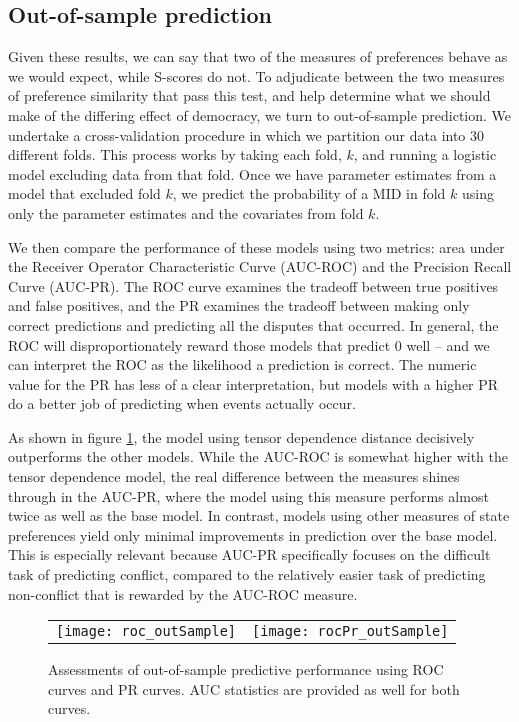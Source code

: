 \subsection*{Out-of-sample prediction}

Given these results, we can say that two of the measures of preferences behave as we would expect, while S-scores do not. To adjudicate between the two measures of preference similarity that pass this test, and help determine what we should make of the differing effect of democracy, we turn to out-of-sample prediction. We undertake a cross-validation procedure in which we partition our data into 30 different folds. This process works by taking each fold, $k$, and running a logistic model excluding data from that fold. Once we have parameter estimates from a model that excluded fold $k$, we predict the probability of a MID in fold $k$ using only the parameter estimates and the covariates from fold $k$.

We then compare the performance of these models using two metrics: area under the Receiver Operator Characteristic Curve (AUC-ROC) and the Precision Recall Curve (AUC-PR). The ROC curve examines the tradeoff between true positives and false positives, and the PR examines the tradeoff between making only correct predictions and predicting all the disputes that occurred. In general, the ROC will disproportionately reward those models that predict $0$ well -- and we can interpret the ROC as the likelihood a prediction is correct. The numeric value for the PR has less of a clear interpretation, but models with a higher PR do a better job of predicting when events actually occur.

As shown in figure \ref{fig:roc}, the model using tensor dependence distance decisively outperforms the other models. While the AUC-ROC is somewhat higher with the tensor dependence model, the real difference between the measures shines through in the AUC-PR, where the model using this measure performs almost twice as well as the base model. In contrast, models using other measures of state preferences yield only minimal improvements in prediction over the base model. This is especially relevant because AUC-PR specifically focuses on the difficult task of predicting conflict, compared to the relatively easier task of predicting non-conflict that is rewarded by the AUC-ROC measure.

\begin{figure}[ht]
	\centering
	\begin{tabular}{cc}
	\texttt{[image: roc\_outSample]} &
	\texttt{[image: rocPr\_outSample]}
	\end{tabular}
	\caption{Assessments of out-of-sample predictive performance using ROC curves and PR curves. AUC statistics are provided as well for both curves.}
	\label{fig:roc}
\end{figure}
\FloatBarrier

